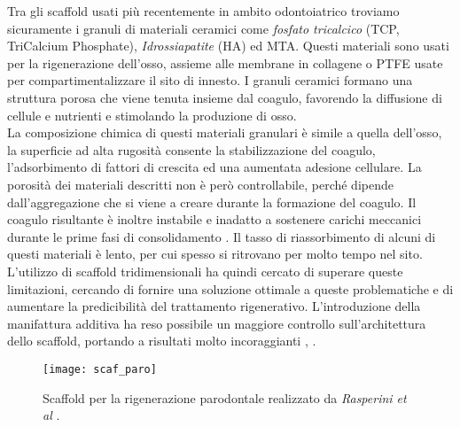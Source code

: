 Tra gli scaffold usati più recentemente in ambito odontoiatrico troviamo sicuramente i granuli di materiali ceramici come \emph{fosfato tricalcico} (TCP, TriCalcium Phosphate), \emph{Idrossiapatite} (HA) ed MTA. Questi materiali sono usati per la rigenerazione dell'osso, assieme alle membrane in collagene o PTFE usate per compartimentalizzare il sito di innesto. I granuli ceramici formano una struttura porosa che viene tenuta insieme dal coagulo, favorendo la diffusione di cellule e nutrienti e stimolando la produzione di osso. \\ La composizione chimica di questi materiali granulari è simile a quella dell'osso, la superficie ad alta rugosità consente la stabilizzazione del coagulo, l'adsorbimento di fattori di crescita ed una aumentata adesione cellulare. La porosità dei materiali descritti non è però controllabile, perché dipende dall'aggregazione che si viene a creare durante la formazione del coagulo. Il coagulo risultante è inoltre instabile e inadatto a sostenere carichi meccanici durante le prime fasi di consolidamento \parencite{Reference131}. Il tasso di riassorbimento di alcuni di questi materiali è lento, per cui spesso si ritrovano per molto tempo nel sito.\\
L'utilizzo di scaffold tridimensionali ha quindi cercato di superare queste limitazioni, cercando di fornire una soluzione ottimale a queste problematiche e di aumentare la predicibilità del trattamento rigenerativo. L'introduzione della manifattura additiva ha reso possibile un maggiore controllo sull'architettura dello scaffold, portando a risultati molto incoraggianti \parencite{Reference136}, \parencite{Reference137}.\\
\begin{figure}[h]
\vspace{-10pt}
	\begin{center}
	\texttt{[image: scaf\_paro]}
    \caption{Scaffold per la rigenerazione parodontale realizzato da \emph{Rasperini et al} \parencite{Reference134}.}
    \label{fig:scaf_paro}
	\end{center}
\vspace{-20pt}
\end{figure}

